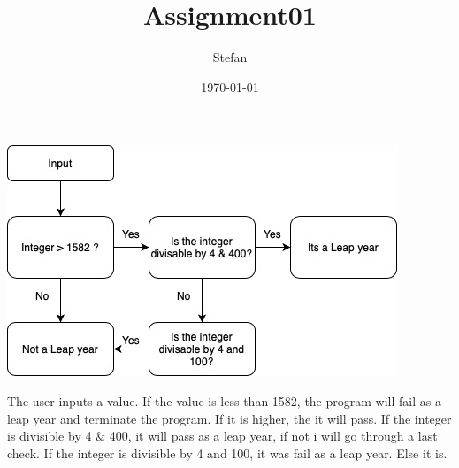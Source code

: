 \documentclass[11pt,a4paper]{article}     %
\begin{document}
    
    \begin{titlepage}
        \title{Assignment01}
        \author{Stefan}
        \date{\today}
        \maketitle
        \thispagestyle{empty}   %
    \end{titlepage}
    
 
 
\includegraphics[scale=1]{FlowcharLeapYear.jpg}

The user inputs a value. If the value is less than 1582, the program will fail as a leap year and terminate the program. If it is higher, the it will pass. If the integer is divisible by 4 & 400, it will pass as a leap year, if not i will go through a last check. If the integer is divisible by 4 and 100, it was fail as a leap year. Else it is.
\end{document}
